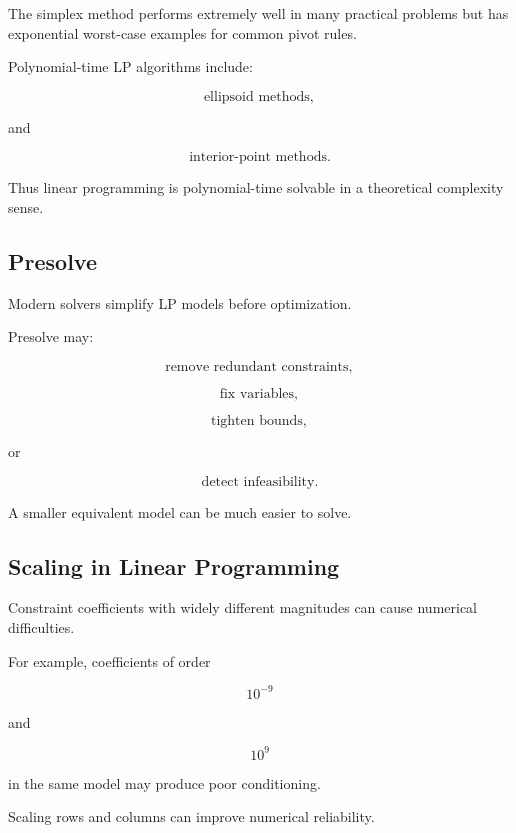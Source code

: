 The simplex method performs extremely well in many practical problems but
has exponential worst-case examples for common pivot rules.

Polynomial-time LP algorithms include:

\[
\boxed{
\text{ellipsoid methods},
}
\]

and

\[
\boxed{
\text{interior-point methods}.
}
\]

Thus linear programming is polynomial-time solvable in a theoretical
complexity sense.

\subsection{Presolve}
\label{subsec:lp-presolve}

Modern solvers simplify LP models before optimization.

Presolve may:

\[
\boxed{
\text{remove redundant constraints},
}
\]

\[
\boxed{
\text{fix variables},
}
\]

\[
\boxed{
\text{tighten bounds},
}
\]

or

\[
\boxed{
\text{detect infeasibility}.
}
\]

A smaller equivalent model can be much easier to solve.

\subsection{Scaling in Linear Programming}
\label{subsec:lp-scaling}

Constraint coefficients with widely different magnitudes can cause
numerical difficulties.

For example, coefficients of order

\[
10^{-9}
\]

and

\[
10^9
\]

in the same model may produce poor conditioning.

Scaling rows and columns can improve numerical reliability.

